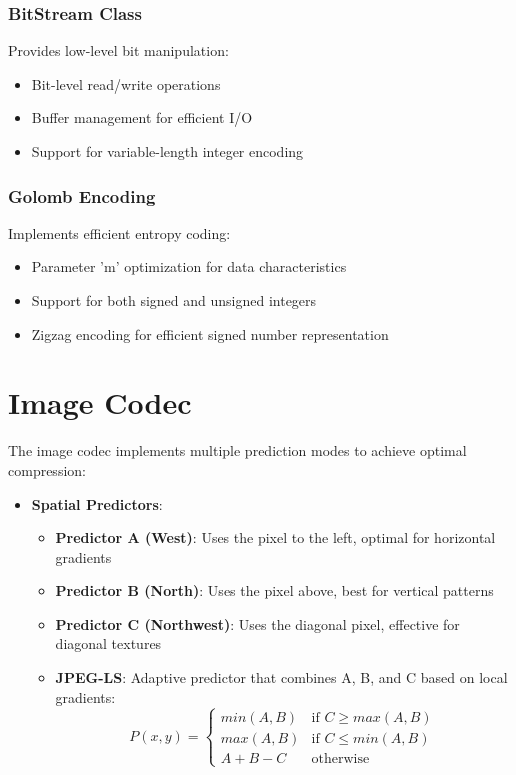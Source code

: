 \documentclass[a4paper,14pt]{article}
\begin{document}
\subsubsection{BitStream Class}
Provides low-level bit manipulation:
\begin{itemize}
    \item Bit-level read/write operations
    \item Buffer management for efficient I/O
    \item Support for variable-length integer encoding
\end{itemize}

\subsubsection{Golomb Encoding}
Implements efficient entropy coding:
\begin{itemize}
    \item Parameter 'm' optimization for data characteristics
    \item Support for both signed and unsigned integers
    \item Zigzag encoding for efficient signed number representation
\end{itemize}

\section{Image Codec}
The image codec implements multiple prediction modes to achieve optimal compression:

\begin{itemize}
    \item \textbf{Spatial Predictors}:
    \begin{itemize}
        \item \textbf{Predictor A (West)}: Uses the pixel to the left, optimal for horizontal gradients
        \item \textbf{Predictor B (North)}: Uses the pixel above, best for vertical patterns
        \item \textbf{Predictor C (Northwest)}: Uses the diagonal pixel, effective for diagonal textures
        \item \textbf{JPEG-LS}: Adaptive predictor that combines A, B, and C based on local gradients:
        \begin{equation}
            P(x,y) = \begin{cases}
                min(A,B) & \text{if } C \geq max(A,B) \\
                max(A,B) & \text{if } C \leq min(A,B) \\
                A + B - C & \text{otherwise}
            \end{cases}
        \end{equation}
    \end{itemize}

  
\end{itemize}
\end{document}
